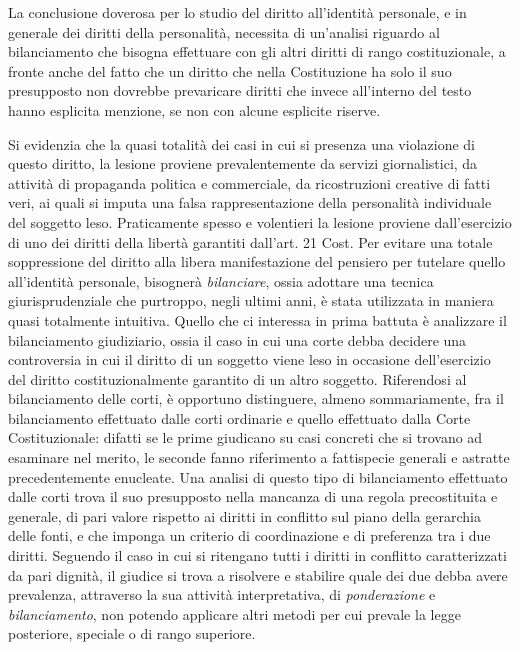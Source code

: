 La conclusione doverosa per lo studio del diritto all'identità personale, e in generale dei diritti della personalità, necessita di un'analisi riguardo al bilanciamento che bisogna effettuare con gli altri diritti di rango costituzionale, a fronte anche del fatto che un diritto che nella Costituzione ha solo il suo presupposto non dovrebbe prevaricare diritti che invece all'interno del testo hanno esplicita menzione, se non con alcune esplicite riserve.

Si evidenzia che la quasi totalità dei casi in cui si presenza una violazione di questo diritto, la lesione proviene prevalentemente da servizi giornalistici, da attività di propaganda politica e commerciale, da ricostruzioni creative di fatti veri, ai quali si imputa una falsa rappresentazione della personalità individuale del soggetto leso. Praticamente spesso e volentieri la lesione proviene dall’esercizio di uno dei diritti della libertà garantiti dall’art. 21 Cost. Per evitare una totale soppressione del diritto alla libera manifestazione del pensiero per tutelare quello all’identità personale, bisognerà \textit{bilanciare}, ossia adottare una tecnica giurisprudenziale che purtroppo, negli ultimi anni, è stata utilizzata in maniera quasi totalmente intuitiva.
Quello che ci interessa in prima battuta è analizzare il bilanciamento giudiziario, ossia il caso in cui una corte debba decidere una controversia in cui il diritto di un soggetto viene leso in occasione dell’esercizio del diritto costituzionalmente garantito di un altro soggetto. 
Riferendosi al bilanciamento delle corti, è opportuno distinguere, almeno sommariamente, fra il bilanciamento effettuato dalle corti ordinarie e quello effettuato dalla Corte Costituzionale: difatti se le prime giudicano su casi concreti che si trovano ad esaminare nel merito, le seconde fanno riferimento a fattispecie generali e astratte precedentemente enucleate. Una analisi di questo tipo di bilanciamento effettuato dalle corti trova il suo presupposto nella mancanza di una regola precostituita e generale, di pari valore rispetto ai diritti in conflitto sul piano della gerarchia delle fonti, e che imponga un criterio di coordinazione e di preferenza tra i due diritti.
Seguendo il caso in cui si ritengano tutti i diritti in conflitto caratterizzati da pari dignità, il giudice si trova a risolvere e stabilire quale dei due debba avere prevalenza, attraverso la sua attività interpretativa, di \textit{ponderazione} e \textit{bilanciamento}, non potendo applicare altri metodi per cui prevale la legge posteriore, speciale o di rango superiore. %
